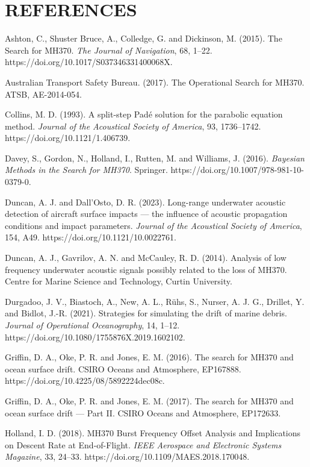 \documentclass[12pt,a4paper]{article}
\begin{document}
\section*{REFERENCES}
\begingroup
\setlength{\parskip}{3pt}
\small

Ashton, C., Shuster Bruce, A., Colledge, G. and Dickinson, M. (2015). The Search for MH370.
\textit{The Journal of Navigation}, 68, 1--22. https://doi.org/10.1017/S037346331400068X.

Australian Transport Safety Bureau. (2017). The Operational Search for MH370. ATSB,
AE-2014-054.

Collins, M. D. (1993). A split-step Pad\'e solution for the parabolic equation method.
\textit{Journal of the Acoustical Society of America}, 93, 1736--1742.
https://doi.org/10.1121/1.406739.

Davey, S., Gordon, N., Holland, I., Rutten, M. and Williams, J. (2016). \textit{Bayesian
Methods in the Search for MH370}. Springer. https://doi.org/10.1007/978-981-10-0379-0.

Duncan, A. J. and Dall'Osto, D. R. (2023). Long-range underwater acoustic detection of aircraft
surface impacts --- the influence of acoustic propagation conditions and impact parameters.
\textit{Journal of the Acoustical Society of America}, 154, A49.
https://doi.org/10.1121/10.0022761.

Duncan, A. J., Gavrilov, A. N. and McCauley, R. D. (2014). Analysis of low frequency underwater
acoustic signals possibly related to the loss of MH370. Centre for Marine Science and
Technology, Curtin University.

Durgadoo, J. V., Biastoch, A., New, A. L., R\"uhs, S., Nurser, A. J. G., Drillet, Y. and
Bidlot, J.-R. (2021). Strategies for simulating the drift of marine debris. \textit{Journal of
Operational Oceanography}, 14, 1--12. https://doi.org/10.1080/1755876X.2019.1602102.

Griffin, D. A., Oke, P. R. and Jones, E. M. (2016). The search for MH370 and ocean surface
drift. CSIRO Oceans and Atmosphere, EP167888. https://doi.org/10.4225/08/5892224dec08c.

Griffin, D. A., Oke, P. R. and Jones, E. M. (2017). The search for MH370 and ocean surface
drift --- Part II. CSIRO Oceans and Atmosphere, EP172633.

Holland, I. D. (2018). MH370 Burst Frequency Offset Analysis and Implications on Descent Rate
at End-of-Flight. \textit{IEEE Aerospace and Electronic Systems Magazine}, 33, 24--33.
https://doi.org/10.1109/MAES.2018.170048.
\end{document}
